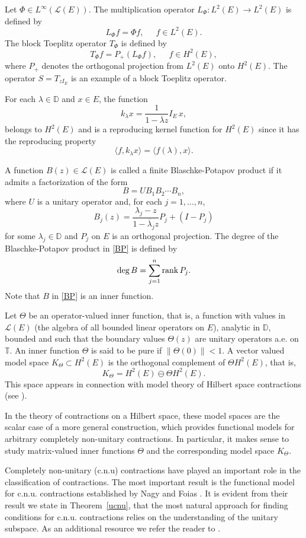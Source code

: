 \documentclass{amsart}
\theoremstyle{definition}
\newcommand{\oL }{\mathcal{L}(E) }
\def\LL{{\mathcal L}}
\begin{document}
\medskip
Let $\Phi\in L^{\infty}(\mathcal{L}(E))$. The multiplication operator $L_\Phi: L^2(E)\to L^2(E)$ is defined by
$$L_{\Phi}f=\Phi f, \quad ~~f\in L^{2}(E).$$
The  block Toeplitz operator $T_{\Phi}$ is defined by
$$T_{\Phi}f=P_{+}(L_\Phi f), \quad ~~f\in H^{2}(E),$$
where $P_{+}$ denotes the orthogonal projection from $L^{2}(E)$ onto $H^{2}(E)$. The operator $S=T_{zI_{E}}$ is an example of a block Toeplitz operator.

For each $\lambda \in \mathbb{D}$ and $x\in E$, the function $$k_\lambda x=\frac{1}{1-\overline{\lambda} z}I_{E}\,x,$$ belongs to $H^2(E)$ and is a reproducing kernel function for $H^2(E)$ since it has the reproducing property
$$\langle f, k_{\lambda}x\rangle=\langle f(\lambda), x\rangle.$$

A function $B(z)\in \LL(E)$ is called a finite
Blaschke-Potapov product if it admits a factorization of the form
\begin{equation}\label{BP}
B=UB_{1}B_{2} \cdots B_{n},
\end{equation}
where $U$ is a unitary operator and, for each $j=1,\dots,n$,
$$B_{j}(z)=\frac{\lambda_{j}-z}{1-\overline{\lambda}_{j}z}P_{j}+(I-P_{j})$$
for some $\lambda_{j}\in \mathbb{D}$ and $P_{j}$ on $E$ is an orthogonal projection. %
The degree of the Blaschke-Potapov product in \eqref{BP} is defined by
$$\text{deg\,} B
=\sum\limits_{j=1}^{n}\text{rank\,} P_{j}.$$
 Note that $B$ in \eqref{BP} is an inner function.

Let $\Theta$ be an operator-valued inner function, that is,  a function with values in $\oL $ (the algebra of all bounded linear operators on $E$), analytic in $\mathbb{D}$, bounded and such that the boundary values $\Theta(z)$ are unitary operators a.e. on $\mathbb{T}$. An inner function $\Theta$ is said to be pure  if $\|\Theta(0)\|<1$.  A vector valued model space $K_{\Theta}\subset H^{2}(E)$ is the orthogonal complement of $\Theta H^{2}(E)$, that is, $$K_{\Theta}= H^{2}(E)\ominus  \Theta H^{2}(E).$$     
This space appears in connection with model theory of Hilbert space contractions (see \cite{NF}).
 \medskip

In the theory of contractions on a Hilbert space, these model spaces are the scalar
case of a more general construction, which provides functional models for arbitrary
completely non-unitary contractions. In particular, it makes sense to study %
 matrix-valued inner functions $\Theta$ and the corresponding model space $K_{\Theta}$. 

\medskip
Completely non-unitary (c.n.u) contractions have played an important role in the classification of contractions. The most important result is the functional model for c.n.u. contractions established
by Nagy and Foias \cite{NF}.  It is evident from their result we state in Theorem~\ref{ucnu}, that the most natural approach for finding conditions for c.n.u. contractions relies on the understanding of the unitary subspace.
As an additional resource we refer the reader to \cite{BT2}.
\end{document}
